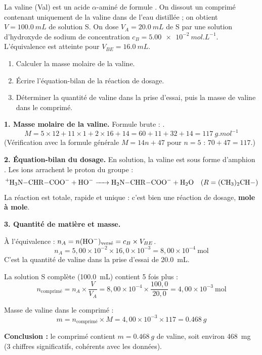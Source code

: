 \documentclass[11pt]{article}
\begin{document}
\begin{exoresolu}
La valine (Val) est un acide $\alpha$-aminé de formule . On dissout un comprimé contenant uniquement de la valine dans de l'eau distillée ; on obtient $V = \SI{100,0}{mL}$ de solution S. On dose $V_A = \SI{20,0}{mL}$ de S par une solution d'hydroxyde de sodium de concentration $c_B = \SI{5,00e-2}{mol.L^{-1}}$. L'équivalence est atteinte pour $V_{BE} = \SI{16,0}{mL}$.
\begin{enumerate}
\item Calculer la masse molaire de la valine.
\item Écrire l'équation-bilan de la réaction de dosage.
\item Déterminer la quantité de valine dans la prise d'essai, puis la masse de valine dans le comprimé.
\end{enumerate}
\tcblower
\textbf{1. Masse molaire de la valine.} Formule brute : .
\[ M = 5 \times 12 + 11 \times 1 + 2 \times 16 + 14 = 60 + 11 + 32 + 14 = \SI{117}{g.mol^{-1}} \]
(Vérification avec la formule générale $M = 14n + 47$ pour $n=5$ : $70 + 47 = 117$.)

\textbf{2. Équation-bilan du dosage.} En solution, la valine est sous forme d'amphion . Les ions  arrachent le proton du groupe  :
\[ \ce{^{+}H3N-CHR-COO- + HO- -> H2N-CHR-COO- + H2O} \quad (R = \ce{(CH3)2CH}-) \]
La réaction est totale, rapide et unique : c'est bien une réaction de dosage, \textbf{mole à mole}.

\textbf{3. Quantité de matière et masse.}

À l'équivalence : $n_A = n(\ce{HO-})_{\text{versé}} = c_B \times V_{BE}$.
\[ n_A = 5{,}00 \times 10^{-2} \times 16{,}0 \times 10^{-3} = 8{,}00 \times 10^{-4}\ \text{mol} \]
C'est la quantité de valine dans la prise d'essai de \SI{20,0}{mL}.

La solution S complète (\SI{100,0}{mL}) contient 5 fois plus :
\[ n_{\text{comprimé}} = n_A \times \frac{V}{V_A} = 8{,}00 \times 10^{-4} \times \frac{100{,}0}{20{,}0} = 4{,}00 \times 10^{-3}\ \text{mol} \]

Masse de valine dans le comprimé :
\[ m = n_{\text{comprimé}} \times M = 4{,}00 \times 10^{-3} \times 117 = \SI{0,468}{g} \]

\textbf{Conclusion :} le comprimé contient $m = \SI{0,468}{g}$ de valine, soit environ \SI{468}{mg} (3 chiffres significatifs, cohérents avec les données).
\end{exoresolu}
\end{document}
